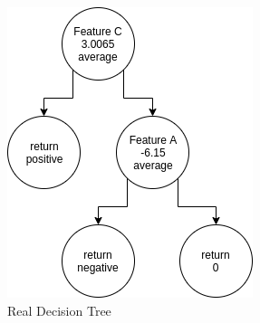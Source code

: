\documentclass{article}
\begin{document}
\begin{figure}[h!]
\centering
\includegraphics[scale=0.75]{Real_Tree.png}
\caption{Real Decision Tree}
\end{figure}
\end{document}
